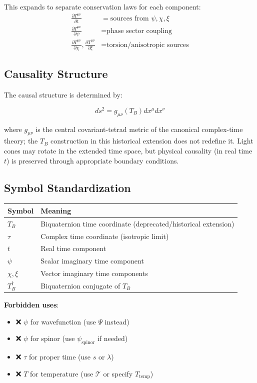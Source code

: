 This expands to separate conservation laws for each component:
\begin{align}
\frac{\partial T^{\mu\nu}}{\partial t} &= \text{sources from } \psi, \chi, \xi \\
\frac{\partial T^{\mu\nu}}{\partial \psi} &= \text{phase sector coupling} \\
\frac{\partial T^{\mu\nu}}{\partial \chi}, \frac{\partial T^{\mu\nu}}{\partial \xi} &= \text{torsion/anisotropic sources}
\end{align}

\subsection{Causality Structure}

The causal structure is determined by:

\begin{equation}
\label{eq:canonical:causality}
ds^2 = g_{\mu\nu}(T_B) dx^\mu dx^\nu
\end{equation}

where $g_{\mu\nu}$ is the central covariant-tetrad metric of the canonical complex-time theory; the $T_B$ construction in this historical extension does not redefine it. Light cones may rotate in the extended time space, but physical causality (in real time $t$) is preserved through appropriate boundary conditions.

\subsection{Symbol Standardization}

\begin{tabular}{ll}
\textbf{Symbol} & \textbf{Meaning} \\
\hline
$T_B$ & Biquaternion time coordinate (deprecated/historical extension) \\
$\tau$ & Complex time coordinate (isotropic limit) \\
$t$ & Real time component \\
$\psi$ & Scalar imaginary time component \\
$\chi, \xi$ & Vector imaginary time components \\
$T_B^\dagger$ & Biquaternion conjugate of $T_B$ \\
\end{tabular}

\vspace{1em}

\textbf{Forbidden uses}:
\begin{itemize}
    \item ❌ $\psi$ for wavefunction (use $\Psi$ instead)
    \item ❌ $\psi$ for spinor (use $\psi_\text{spinor}$ if needed)
    \item ❌ $\tau$ for proper time (use $s$ or $\lambda$)
    \item ❌ $T$ for temperature (use $\mathcal{T}$ or specify $T_{\text{temp}}$)
\end{itemize}

